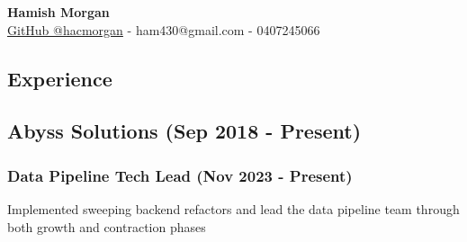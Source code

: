 \documentclass[12pt]{article}
\begin{document}
\begin{center}
  \Large
  \vspace{0.8cm}
  \textbf{Hamish Morgan}\\
  \vspace{0.8cm}
  \large
  \href{https://github.com/hacmorgan}{GitHub @hacmorgan} - ham430@gmail.com - 0407245066

\end{center}


\begin{FlushLeft}

  \section{Experience}

  \subsection{Abyss Solutions (Sep 2018 - Present)}

  \subsubsection{Data Pipeline Tech Lead (Nov 2023 - Present)}
  Implemented sweeping backend refactors and lead the data pipeline team through both growth and contraction phases \\


\end{FlushLeft}
\end{document}
